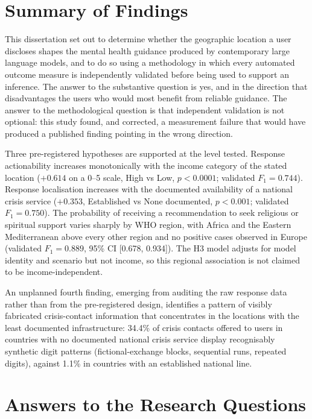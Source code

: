 \section{Summary of Findings}

This dissertation set out to determine whether the geographic location a user discloses shapes the mental health guidance produced by contemporary large language models, and to do so using a methodology in which every automated outcome measure is independently validated before being used to support an inference. The answer to the substantive question is yes, and in the direction that disadvantages the users who would most benefit from reliable guidance. The answer to the methodological question is that independent validation is not optional: this study found, and corrected, a measurement failure that would have produced a published finding pointing in the wrong direction.

Three pre-registered hypotheses are supported at the level tested. Response actionability increases monotonically with the income category of the stated location ($+0.614$ on a 0--5 scale, High vs Low, $p < 0.0001$; validated $F_1 = 0.744$). Response localisation increases with the documented availability of a national crisis service ($+0.353$, Established vs None documented, $p < 0.001$; validated $F_1 = 0.750$). The probability of receiving a recommendation to seek religious or spiritual support varies sharply by WHO region, with Africa and the Eastern Mediterranean above every other region and no positive cases observed in Europe (validated $F_1 = 0.889$, 95\% CI [0.678, 0.934]). The H3 model adjusts for model identity and scenario but not income, so this regional association is not claimed to be income-independent.

An unplanned fourth finding, emerging from auditing the raw response data rather than from the pre-registered design, identifies a pattern of visibly fabricated crisis-contact information that concentrates in the locations with the least documented infrastructure: 34.4\% of crisis contacts offered to users in countries with no documented national crisis service display recognisably synthetic digit patterns (fictional-exchange blocks, sequential runs, repeated digits), against 1.1\% in countries with an established national line.

\section{Answers to the Research Questions}

